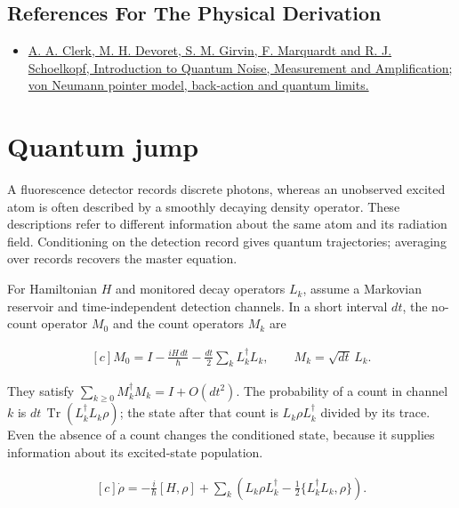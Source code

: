 \documentclass[11pt,oneside]{book}
\newenvironment{centeredalign}{\[\begin{gathered}[c]}{\end{gathered}\]}
\begin{document}
\subsection*{References For The Physical Derivation}
\begin{itemize}
\item \href{https://arxiv.org/abs/0810.4729}{A. A. Clerk, M. H. Devoret, S. M. Girvin, F. Marquardt and R. J. Schoelkopf, Introduction to Quantum Noise, Measurement and Amplification; von Neumann pointer model, back-action and quantum limits.}
\end{itemize}





\clearpage

\section{Quantum jump}

\label{topic:quantum-jump}

A fluorescence detector records discrete photons, whereas an unobserved excited atom is often described by a smoothly decaying density operator. These descriptions refer to different information about the same atom and its radiation field. Conditioning on the detection record gives quantum trajectories; averaging over records recovers the master equation.

For Hamiltonian \(H\) and monitored decay operators \(L_k\), assume a Markovian reservoir and time-independent detection channels. In a short interval \(dt\), the no-count operator \(M_0\) and the count operators \(M_k\) are

\begin{centeredalign}
M_0=I-\frac{iH\,dt}{\hbar}-\frac{dt}{2}\sum_kL_k^\dagger L_k,
\qquad M_k=\sqrt{dt}\,L_k.
\end{centeredalign}

They satisfy \(\sum_{k\geq0}M_k^\dagger M_k=I+O(dt^2)\). The probability of a count in channel \(k\) is \(dt\,\operatorname{Tr}(L_k^\dagger L_k\rho)\); the state after that count is \(L_k\rho L_k^\dagger\) divided by its trace. Even the absence of a count changes the conditioned state, because it supplies information about its excited-state population.

\begin{centeredalign}
\dot\rho=-\frac{i}{\hbar}[H,\rho]+\sum_k
\left(L_k\rho L_k^\dagger-\frac12\{L_k^\dagger L_k,\rho\}\right).
\end{centeredalign}
\end{document}
